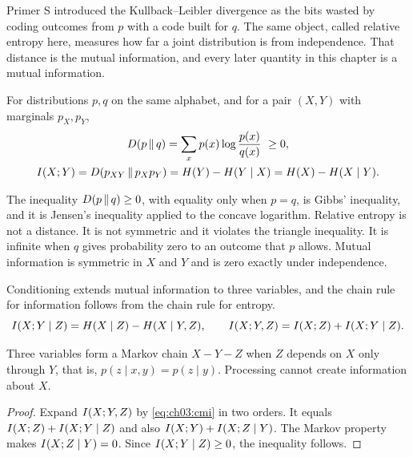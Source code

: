 Primer S introduced the Kullback--Leibler divergence as the bits wasted by coding outcomes from $p$ with a code built for $q$. The same object, called relative entropy here, measures how far a joint distribution is from independence. That distance is the mutual information, and every later quantity in this chapter is a mutual information.

\begin{definition}\label{def:ch03:kl-mi}
For distributions $p,q$ on the same alphabet, and for a pair $(X,Y)$ with marginals $p_X,p_Y$,
\begin{equation}\label{eq:ch03:kl-mi}
\begin{gathered}
D\!\left(p\,\middle\|\,q\right)=\sum_x p(x)\log\frac{p(x)}{q(x)}\ \ge 0,\\
I(X;Y)=D\!\left(p_{XY}\,\middle\|\,p_Xp_Y\right)=H(Y)-H(Y\mid X)=H(X)-H(X\mid Y).
\end{gathered}
\end{equation}
\end{definition}

The inequality $D\!\left(p\,\middle\|\,q\right)\ge0$, with equality only when $p=q$, is Gibbs' inequality, and it is Jensen's inequality applied to the concave logarithm. Relative entropy is not a distance. It is not symmetric and it violates the triangle inequality. It is infinite when $q$ gives probability zero to an outcome that $p$ allows. Mutual information is symmetric in $X$ and $Y$ and is zero exactly under independence.

Conditioning extends mutual information to three variables, and the chain rule for information follows from the chain rule for entropy.
\begin{equation}\label{eq:ch03:cmi}
I(X;Y\mid Z)=H(X\mid Z)-H(X\mid Y,Z),\qquad
I(X;Y,Z)=I(X;Z)+I(X;Y\mid Z).
\end{equation}

Three variables form a Markov chain $X-Y-Z$ when $Z$ depends on $X$ only through $Y$, that is, $p(z\mid x,y)=p(z\mid y)$. Processing cannot create information about $X$.

\begin{proof}
Expand $I(X;Y,Z)$ by \eqref{eq:ch03:cmi} in two orders. It equals $I(X;Z)+I(X;Y\mid Z)$ and also $I(X;Y)+I(X;Z\mid Y)$. The Markov property makes $I(X;Z\mid Y)=0$. Since $I(X;Y\mid Z)\ge0$, the inequality follows.
\end{proof}

